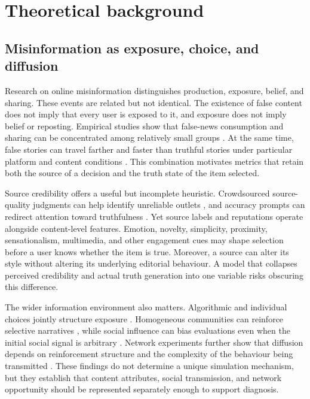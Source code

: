 \section{Theoretical background}
\label{sec:background}

\subsection{Misinformation as exposure, choice, and diffusion}

Research on online misinformation distinguishes production, exposure, belief, and sharing. These events are related but not identical. The existence of false content does not imply that every user is exposed to it, and exposure does not imply belief or reposting. Empirical studies show that false-news consumption and sharing can be concentrated among relatively small groups \citep{grinberg2019,guess2019}. At the same time, false stories can travel farther and faster than truthful stories under particular platform and content conditions \citep{vosoughi2018}. This combination motivates metrics that retain both the source of a decision and the truth state of the item selected.

Source credibility offers a useful but incomplete heuristic. Crowdsourced source-quality judgments can help identify unreliable outlets \citep{pennycook2019}, and accuracy prompts can redirect attention toward truthfulness \citep{pennycook2020,epstein2021}. Yet source labels and reputations operate alongside content-level features. Emotion, novelty, simplicity, proximity, sensationalism, multimedia, and other engagement cues may shape selection before a user knows whether the item is true. Moreover, a source can alter its style without altering its underlying editorial behaviour. A model that collapses perceived credibility and actual truth generation into one variable risks obscuring this difference.

The wider information environment also matters. Algorithmic and individual choices jointly structure exposure \citep{bakshy2015}. Homogeneous communities can reinforce selective narratives \citep{delvicario2016}, while social influence can bias evaluations even when the initial social signal is arbitrary \citep{muchnik2013}. Network experiments further show that diffusion depends on reinforcement structure and the complexity of the behaviour being transmitted \citep{centola2010}. These findings do not determine a unique simulation mechanism, but they establish that content attributes, social transmission, and network opportunity should be represented separately enough to support diagnosis.

